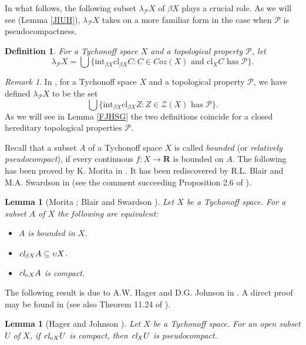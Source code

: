 \documentclass{amsart}
\newtheorem{lemma}[theorem]{Lemma}
\theoremstyle{definition}
\newtheorem{definition}[theorem]{Definition}
\theoremstyle{remark}
\newtheorem{remark}[theorem]{Remark}
\theoremstyle{notation}
\numberwithin{equation}{section}
\begin{document}
In what follows, the following subset $\lambda_{{\mathcal P}} X$ of $\beta X$ plays a crucial
role. As we will see (Lemma \ref{JIUH}), $\lambda_{{\mathcal P}} X$ takes on a more familiar
form in the case when ${\mathcal P}$ is pseudocompactness.

\begin{definition}\label{HGA}
{\em For a  Tychonoff
space $X$ and a topological property  ${\mathcal P}$, let
\[\lambda_{{\mathcal P}} X=\bigcup\big\{\mbox{int}_{\beta X} \mbox{cl}_{\beta X}C:C\in Coz(X)\mbox{ and } \mbox{cl}_X C \mbox{ has }{\mathcal P}\big\}.\]}
\end{definition}

\begin{remark}
In  \cite{Ko3}, for a Tychonoff space $X$ and a topological property $\mathcal{P}$, we have defined $\lambda_{\mathcal{P}} X$ to be the set
\[\bigcup\big\{\mbox{int}_{\beta X}\mbox{cl}_{\beta X}Z: Z\in {\mathscr Z}(X) \mbox { has $\mathcal{P}$}\big\}.\]
As we will see in Lemma \ref{FJHSG} the two definitions coincide for a closed hereditary topological properties ${\mathcal P}$.
\end{remark}

Recall that a  subset $A$ of a Tychonoff space $X$ is called {\em bounded} (or {\em relatively pseudocompact}), if every continuous
$f:X\rightarrow\mathbf{R}$  is bounded on $A$. The following has been  proved by K. Morita in \cite{M}. It has been  rediscovered by R.L. Blair and M.A. Swardson
in \cite{BS} (see the comment succeeding  Proposition 2.6 of \cite{BS}).

\begin{lemma}[Morita \cite{M}; Blair and Swardson \cite{BS}]\label{B}
Let $X$ be a Tychonoff space. For a subset  $A$ of  $X$ the following are equivalent:
\begin{itemize}
\item[\rm(1)] $A$ is bounded in $X$.
\item[\rm(2)] $\mbox{\em cl}_{\beta X} A\subseteq\upsilon X$.
\item[\rm(3)] $\mbox{\em cl}_{\upsilon X} A$ is compact.
\end{itemize}
\end{lemma}

The following result is due to  A.W. Hager and D.G. Johnson in \cite{HJ}. A direct proof may be found in \cite{C} (see also Theorem 11.24 of \cite{W}).

\begin{lemma}[Hager and Johnson \cite{HJ}]\label{A}
Let $X$ be a Tychonoff space. For an open  subset  $U$ of $X$, if  $\mbox{\em cl}_{\upsilon X} U$ is compact, then  $\mbox{\em cl}_X U$ is pseudocompact.
\end{lemma}
\end{document}
